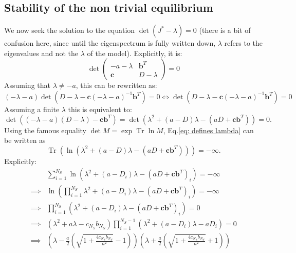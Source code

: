 \documentclass[12pt]{article}
\DeclareMathOperator{\Tr}{Tr}
\newcommand{\vect}[1]{\textbf{#1}}
\begin{document}
\begin{appendices}
		\subsection{Stability of the non trivial equilibrium}
	We now seek the solution to the equation $\det(J^*-\lambda)=0$ (there is a bit of confusion here, since until the eigenspectrum is fully written down, $\lambda$ refers to the eigenvalues and not the $\lambda$ of the model). Explicitly, it is:
	\begin{equation}
		\det
		\begin{pmatrix}
			-a-\lambda & \vect{b}^T \\
			\vect{c} & D-\lambda
		\end{pmatrix}
		=0 \label{eq : block matrix equilibrium one resource}
	\end{equation}
	Assuming that $\lambda \neq -a$, this can be rewritten as:
	\begin{equation}
		\left(-\lambda-a\right)\det\left(D-\lambda-\vect{c}\left(-\lambda-a\right)^{-1}\vect{b}^T\right) = 0 \iff \det\left(D-\lambda-\vect{c}\left(-\lambda-a\right)^{-1}\vect{b}^T\right) =0 
	\end{equation}
	Assuming a finite $\lambda$ this is equivalent to: 
	\begin{equation}
		\det\left(\left(-\lambda-a\right)\left(D-\lambda\right)-\vect{c}\vect{b}^T\right) = \det\left(\lambda^2+(a-D)\lambda-(aD+\vect{c}\vect{b}^T)\right)=0.
		\label{eq: defines lambda}
	\end{equation}
	Using the famous equality $\det M=\exp\Tr\ln M$, Eq.\eqref{eq: defines lambda}
	can be written as
	\begin{equation}
		\Tr\left(\ln\left(\lambda^2+(a-D)\lambda-(aD+\vect{c}\vect{b}^T)\right)\right)=-\infty.
	\end{equation}
	Explicitly:
	\begin{align}
		& \sum_{i=1}^{N_S} \ln\left(\lambda^2+(a-D_i) \lambda - (aD+\vect{c}\vect{b}^T)_i\right) = -\infty \\
		\implies& \ln\left(\prod_{i=1}^{N_S} \lambda^2+(a-D_i) \lambda - (aD+\vect{c}\vect{b}^T)_i\right) = -\infty \\
		\implies& \prod_{i=1}^{N_S} \left(\lambda^2+(a-D_i) \lambda - (aD+\vect{c}\vect{b}^T)_i\right) =0 \\
		\implies& \left(\lambda^2+a\lambda-c_{N_S}b_{N_S}\right)\prod_{i=1}^{N_S-1} \left(\lambda^2+(a-D_i) \lambda - aD_i\right)  =0 \\
		\implies& \left(\lambda-\frac{a}{2}\left(\sqrt{1+\frac{4 c_{N_S} b_{N_S}}{a^2}}-1\right)\right)\left(\lambda+\frac{a}{2}\left(\sqrt{1+\frac{4 c_{N_S} b_{N_S}}{a^2}}+1\right)\right)

\end{align}
\end{appendices}
\end{document}
